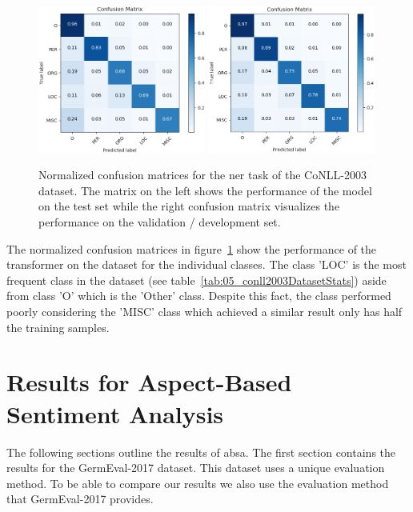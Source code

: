 \begin{figure}[ht]
    \centering
    \includegraphics[width=0.49\textwidth]{figures/06_results/06_ner_final_test_c_matrix}
    \includegraphics[width=0.49\textwidth]{figures/06_results/06_ner_final_valid_c_matrix}
    \caption{Normalized confusion matrices for the \gls{ner} task of the CoNLL-2003 dataset. The matrix on the left shows the performance of the model on the test set while the right confusion matrix visualizes the performance on the validation / development set.}
    \label{fig:06_NER_cmatrices}
\end{figure}

The normalized confusion matrices in figure~\ref{fig:06_NER_cmatrices} show the performance of the transformer on the dataset for the individual classes. The class 'LOC' is the most frequent class in the dataset {(see table~\ref{tab:05_conll2003DatasetStats})} aside from class 'O' which is the 'Other' class. Despite this fact, the class performed poorly considering the 'MISC' class which achieved a similar result only has half the training samples.



\section{Results for Aspect-Based Sentiment Analysis}
The following sections outline the results of \acrfull{absa}. The first section contains the results for the GermEval-2017 dataset. This dataset uses a unique evaluation method. To be able to compare our results we also use the evaluation method that GermEval-2017 provides.

